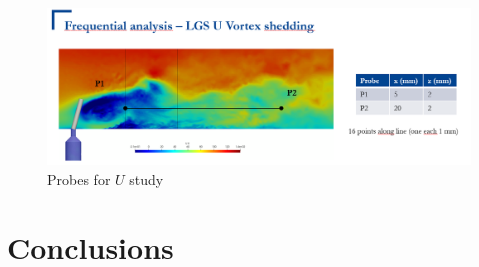 \begin{figure}[h!]
	\centering
	\includegraphics[scale=0.7]{./part2_developments/figures_ch6_lagrangian_JICF/probes_U_planey0}
	\caption{Probes for $U$ study}
	\label{fig:probes_U_planey0}
\end{figure}



\section{Conclusions}